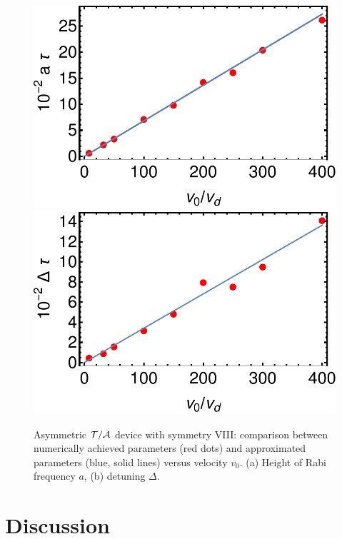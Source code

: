 \begin{figure}
  \begin{center}
  \includegraphics[width=0.48\linewidth]{Figures/asym_fig_t_a_param1.pdf}
  \includegraphics[width=0.48\linewidth]{Figures/asym_fig_t_a_param2.pdf}
  \end{center}
  \caption{Asymmetric ${\cal T/A}$ device with symmetry VIII: comparison between numerically achieved parameters (red dots) and approximated parameters (blue, solid lines) versus velocity $v_0$.
  (a) Height of Rabi frequency $a$, (b) detuning $\Delta$.
  \label{fig_t_a_param}}
\end{figure}

%
%
%
%

%
%
\section{Discussion\label{sec:chapter3_Discussion}}


